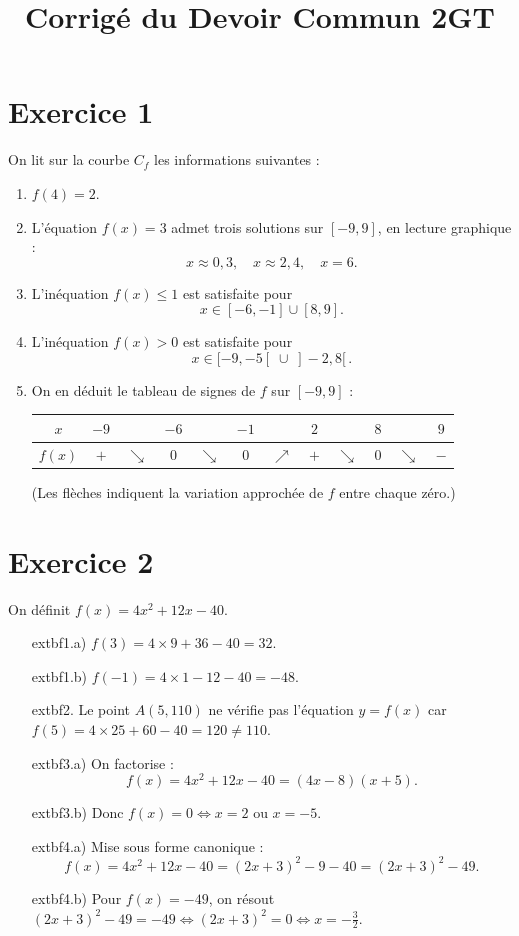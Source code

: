 \documentclass[12pt,a4paper]{article}
\title{\textbf{Corrigé du Devoir Commun 2GT}}
\author{}
\date{}
\begin{document}
\maketitle

\section*{Exercice 1}
On lit sur la courbe $C_f$ les informations suivantes :
\begin{enumerate}
  \item $f(4)=2$.
  \item L'équation $f(x)=3$ admet trois solutions sur $[-9,9]$, en lecture graphique :
  \[x\approx0{,}3,\quad x\approx2{,}4,\quad x=6.\]
  \item L'inéquation $f(x)\le1$ est satisfaite pour
  \[x\in[-6,-1]\cup[8,9].\]
  \item L'inéquation $f(x)>0$ est satisfaite pour
  \[x\in[-9,-5[\;\cup\;]-2,8[\,.\]
  \item On en déduit le tableau de signes de $f$ sur $[-9,9]$ :
  
  \begin{center}
  \begin{tabular}{c|ccccccccccc}
$x$ & $-9$ & & $-6$ & & $-1$ & & $2$ & & $8$ & & $9$ \\
    \hline
$f(x)$ & $+$ & $\,\searrow\,$ & $0$ & $\,\searrow\,$ & $0$ & $\,\nearrow\,$ & $+$ & $\,\searrow\,$ & $0$ & $\,\searrow\,$ & $-$
  \end{tabular}
  \end{center}
  
  (Les flèches indiquent la variation approchée de $f$ entre chaque zéro.)
\end{enumerate}

\section*{Exercice 2}
On définit $f(x)=4x^2+12x-40$.
\begin{enumerate}
  \item[	extbf{1.a)}] $f(3)=4\times9+36-40=32.$
  \item[	extbf{1.b)}] $f(-1)=4\times1-12-40=-48.$
  \item[	extbf{2.}] Le point $A(5,110)$ ne vérifie pas l'équation $y=f(x)$ car $f(5)=4\times25+60-40=120\neq110$.
  \item[	extbf{3.a)}] On factorise :
  \[f(x)=4x^2+12x-40=(4x-8)(x+5).\]
  \item[	extbf{3.b)}] Donc $f(x)=0\iff x=2\text{ ou }x=-5$.
  \item[	extbf{4.a)}] Mise sous forme canonique :
  \[f(x)=4x^2+12x-40=(2x+3)^2-9-40=(2x+3)^2-49.\]
  \item[	extbf{4.b)}] Pour $f(x)=-49$, on résout $(2x+3)^2-49=-49\iff(2x+3)^2=0\iff x=-\tfrac32$.
\end{enumerate}
\end{document}
